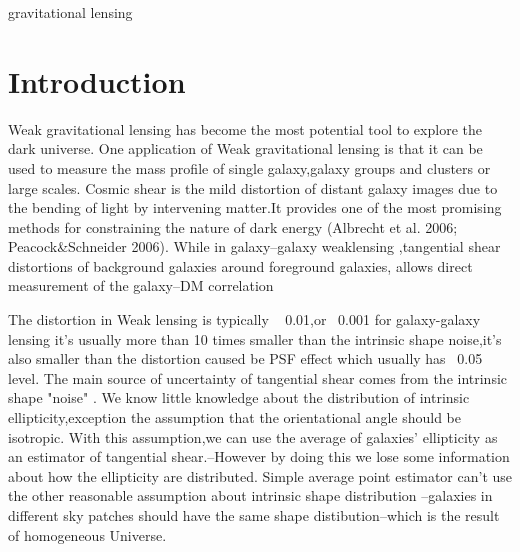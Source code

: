 \documentclass[useAMS,usenatbib]{mn2e}
\begin{document}
\begin{keywords}
  gravitational lensing
\end{keywords}

\setcounter{footnote}{1}


\section{Introduction}
\label{sec:intro}







Weak gravitational lensing has become the most potential tool to explore the dark universe. 
One application of Weak gravitational lensing is that it can be used to measure the mass profile of single galaxy,galaxy groups and clusters or large scales.
Cosmic shear is the mild distortion of distant galaxy images due to the bending of light by intervening matter.It provides one of the most promising methods for constraining the nature of dark energy (Albrecht et al. 2006; Peacock&Schneider 2006). 
While in galaxy--galaxy weaklensing ,tangential shear distortions of background galaxies around foreground galaxies, allows direct measurement of the galaxy–DM correlation




The distortion in Weak lensing is typically ~ 0.01,or ~0.001 for galaxy-galaxy lensing  it's usually more than 10 times smaller than the intrinsic shape 
noise,it's also smaller than the distortion caused be PSF effect which usually has ~0.05 level.
The main source of uncertainty of tangential shear comes from the intrinsic shape "noise" . We know little knowledge about 
the distribution of intrinsic ellipticity,exception the assumption that the orientational angle should be isotropic.
With this assumption,we can use the average of galaxies' ellipticity as an estimator of tangential shear.--However by 
doing this we lose some information about how the ellipticity are distributed. Simple average point estimator can't 
use the other reasonable assumption about intrinsic shape distribution --galaxies in different sky patches should have 
the same shape distibution--which is the result of homogeneous Universe.
\end{document}
